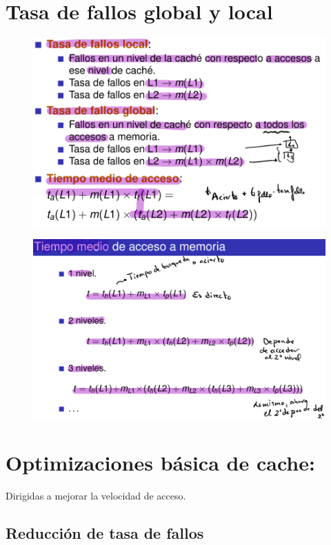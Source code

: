 \documentclass[12pt, twoside, openright]{report} %
\begin{document}
  \section{Tasa de fallos global y local}
  \begin{figure}[H]
    {\includegraphics[scale=.4]{Untitled 16.png}}
  \end{figure}
  \begin{figure}[H]
    {\includegraphics[scale=.4]{Untitled 17.png}}
  \end{figure}
  \section{Optimizaciones básica de cache:}

  Dirigidas a mejorar la velocidad de acceso.

  \subsection{Reducción de tasa de fallos}
\end{document}
